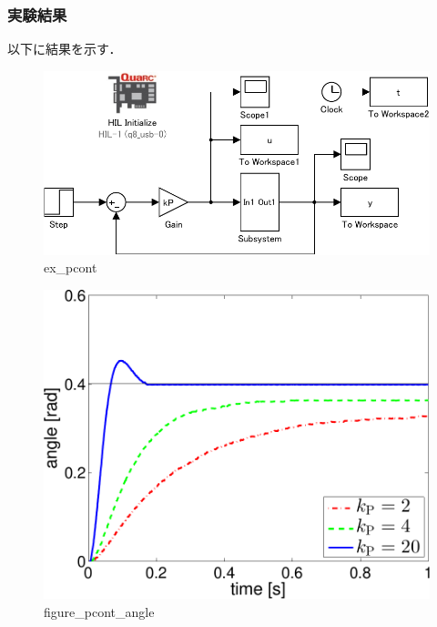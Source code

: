 \subsubsection{実験結果}
以下に結果を示す．
\begin{figure}[h]
  \centering
  \includegraphics[scale=1]{sozai/ex_pcont-crop.pdf}
  \caption{ex\_pcont}
\end{figure}

\begin{figure}[h]
  \centering
  \includegraphics[scale=0.6]{sozai/figure_pcont_angle-crop.pdf}
  \caption{figure\_pcont\_angle}
\end{figure}

